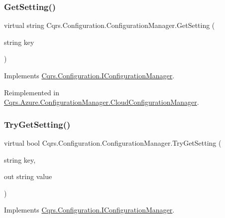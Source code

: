 \subsubsection{\texorpdfstring{Get\+Setting()}{GetSetting()}}
{\footnotesize\ttfamily virtual string Cqrs.\+Configuration.\+Configuration\+Manager.\+Get\+Setting (\begin{DoxyParamCaption}\item[{string}]{key }\end{DoxyParamCaption})\hspace{0.3cm}{\ttfamily [virtual]}}



Implements \hyperlink{interfaceCqrs_1_1Configuration_1_1IConfigurationManager_a9f7b7d4d8c26a0589f01c8a7f69901ef}{Cqrs.\+Configuration.\+I\+Configuration\+Manager}.



Reimplemented in \hyperlink{classCqrs_1_1Azure_1_1ConfigurationManager_1_1CloudConfigurationManager_a48228b7e2204a2449426de32cd6ecc65}{Cqrs.\+Azure.\+Configuration\+Manager.\+Cloud\+Configuration\+Manager}.

\mbox{\label{classCqrs_1_1Configuration_1_1ConfigurationManager_ad87af2a011af065d6d3e0d2ff01c7f6e}} 
\subsubsection{\texorpdfstring{Try\+Get\+Setting()}{TryGetSetting()}\hspace{0.1cm}{\footnotesize\ttfamily [1/2]}}
{\footnotesize\ttfamily virtual bool Cqrs.\+Configuration.\+Configuration\+Manager.\+Try\+Get\+Setting (\begin{DoxyParamCaption}\item[{string}]{key,  }\item[{out string}]{value }\end{DoxyParamCaption})\hspace{0.3cm}{\ttfamily [virtual]}}



Implements \hyperlink{interfaceCqrs_1_1Configuration_1_1IConfigurationManager_ac4478405e3d9e1c97d14953aea4e695b}{Cqrs.\+Configuration.\+I\+Configuration\+Manager}.

